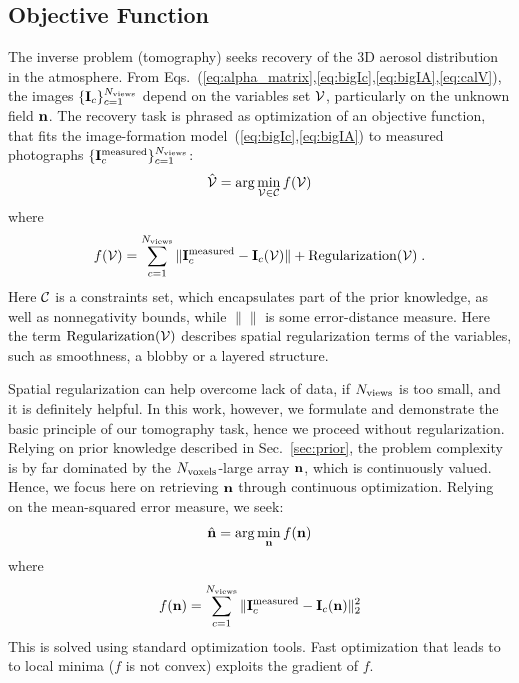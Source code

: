 \documentclass[10pt,twocolumn,letterpaper]{article}
\newcommand{\argmin}{\mathrm{arg}\min}
\begin{document}
\subsection{Objective Function}
\label{sec:objective-function}

The inverse problem (tomography) seeks recovery of the 3D aerosol distribution in the
atmosphere. From Eqs.~(\ref{eq:alpha_matrix},\ref{eq:bigIc},\ref{eq:bigIA},\ref{eq:calV}),
the images $\{ {\bf I}_c\}_{c=1}^{N_{\rm views}}$ depend on the variables set ${\cal V}$, particularly on the unknown field ${\bf n}$. The recovery task is phrased as optimization of an objective function, that fits the image-formation model~(\ref{eq:bigIc},\ref{eq:bigIA}) to
measured photographs $\{ {\bf I}^{\rm measured}_c\}_{c=1}^{N_{\rm views}}$:
\begin{equation}
  \label{eq:mingenobjective}
  \hat{\cal V} = \argmin_{{\cal V}\in {\cal C}} f({\cal V})
\end{equation}
where
\begin{equation}
  \label{eq:genobjective}
  f({\cal V}) = \sum_{c=1}^{N_{\rm views}}
  \| {\bf I}^{\rm measured}_c - {\bf I}_c({\cal V})\| + {\rm Regularization}({\cal V})
  \;.
\end{equation}
Here ${\cal C}$ is a constraints set, which encapsulates part of the prior knowledge,
as well as nonnegativity bounds, while $\| \|$ is some error-distance measure.
Here the term ${\rm Regularization}({\cal V})$ describes spatial regularization terms of the variables, such as smoothness, a blobby or a layered structure.

Spatial regularization can help overcome lack of data, if $N_{\rm views}$ is too small, and it is definitely helpful. In this work, however, we formulate and demonstrate the basic principle of our tomography task, hence
we proceed without regularization. Relying on prior knowledge described in Sec.~\ref{sec:prior}, the problem complexity is by far dominated by the $N_{\rm voxels}$-large array ${\bf n}$, which is continuously valued. Hence, we focus here on retrieving ${\bf n}$ through continuous optimization. Relying on the mean-squared error measure, we seek:
\begin{equation}
  \label{eq:minobjectiveA}
  \hat{\bf n} =
      \argmin_{{\bf n}} f({\bf n})
\end{equation}
where
\begin{equation}
  \label{eq:objectiveA}
  f({\bf n})
   = \sum_{c=1}^{N_{\rm views}}
  \| {\bf I}^{\rm measured}_c - {\bf I}_c({\bf n})\|^2_2
\end{equation}
This is solved using standard optimization tools. Fast optimization that leads to
to local minima ($f$ is not convex) exploits the gradient of $f$.
\end{document}
